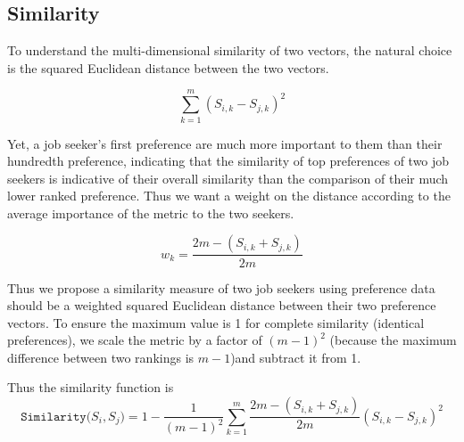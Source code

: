 \subsection{Similarity}

To understand the multi-dimensional similarity of two vectors, the natural choice is the squared Euclidean distance between the two vectors. 

\[\sum_{k=1}^{m} (S_{i,k} - S_{j,k})^2\]

Yet, a job seeker's first preference are much more important to them than their hundredth preference, indicating that the similarity of top preferences of two job seekers is indicative of their overall similarity than the comparison of their much lower ranked preference.  Thus we want a weight on the distance according to the average importance of the metric to the two seekers.

\[w_k = \frac{2m - (S_{i,k} + S_{j,k})}{2m}\]


Thus we propose a similarity measure of two job seekers using preference data should be a weighted squared Euclidean distance between their two preference vectors. To ensure the maximum value is 1 for complete similarity (identical preferences), we scale the metric by a factor of $(m-1)^2$ (because the maximum difference between two rankings is $m-1$)and subtract it from 1.

Thus the similarity function is
\[\texttt{Similarity}({S_i, S_j)} = 1 - \frac{1}{(m-1)^2}\sum_{k=1}^{m} \frac{2m - (S_{i,k} + S_{j,k})}{2m}(S_{i,k} - S_{j,k})^2\]